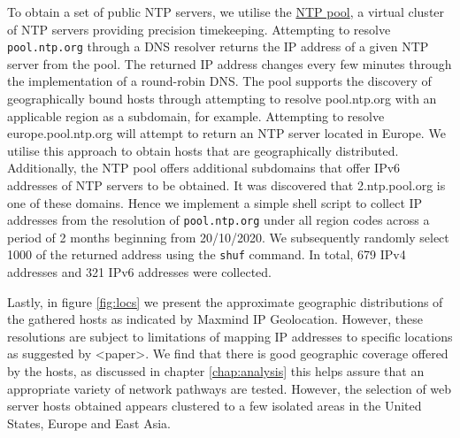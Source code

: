 \documentclass{l4proj}
\begin{document}
To obtain a set of public NTP servers, we utilise the \href{https://www.pool.ntp.org}{NTP pool}, a virtual cluster of NTP servers providing precision timekeeping. Attempting to resolve \lstinline{pool.ntp.org} through a DNS resolver returns the IP address of a given NTP server from the pool. The returned IP address changes every few minutes through the implementation of a round-robin DNS. The pool supports the discovery of geographically bound hosts through attempting to resolve pool.ntp.org with an applicable region as a subdomain, for example. Attempting to resolve europe.pool.ntp.org will attempt to return an NTP server located in Europe. We utilise this approach to obtain hosts that are geographically distributed. Additionally, the NTP pool offers additional subdomains that offer IPv6 addresses of NTP servers to be obtained. It was discovered that 2.ntp.pool.org is one of these domains.
Hence we implement a simple shell script to collect IP addresses from the resolution of \lstinline{pool.ntp.org} under all region codes across a period of 2 months beginning from 20/10/2020. We subsequently randomly select 1000 of the returned address using the \lstinline{shuf} command. In total, 679 IPv4 addresses and 321 IPv6 addresses were collected.

Lastly, in figure \ref{fig:locs} we present the approximate geographic distributions of the gathered hosts as indicated by Maxmind IP Geolocation. However, these resolutions are subject to limitations of mapping IP addresses to specific locations as suggested by <paper>. We find that there is good geographic coverage offered by the hosts, as discussed in chapter \ref{chap:analysis} this helps assure that an appropriate variety of network pathways are tested. However, the selection of web server hosts obtained appears clustered to a few isolated areas in the United States, Europe and East Asia.
\end{document}
